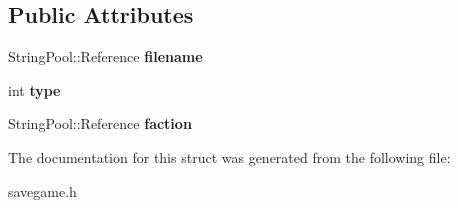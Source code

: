 \subsection*{Public Attributes}
\begin{DoxyCompactItemize}
\item 
String\+Pool\+::\+Reference {\bfseries filename}\hypertarget{structSavedUnits_aaa894f667c0c4f6e259f51638c98856b}{}\label{structSavedUnits_aaa894f667c0c4f6e259f51638c98856b}

\item 
int {\bfseries type}\hypertarget{structSavedUnits_a4bac705877f59e101a01b0730ff3ec1c}{}\label{structSavedUnits_a4bac705877f59e101a01b0730ff3ec1c}

\item 
String\+Pool\+::\+Reference {\bfseries faction}\hypertarget{structSavedUnits_a095e495073f84f228dcf59921e9c998b}{}\label{structSavedUnits_a095e495073f84f228dcf59921e9c998b}

\end{DoxyCompactItemize}


The documentation for this struct was generated from the following file\+:\begin{DoxyCompactItemize}
\item 
savegame.\+h\end{DoxyCompactItemize}
